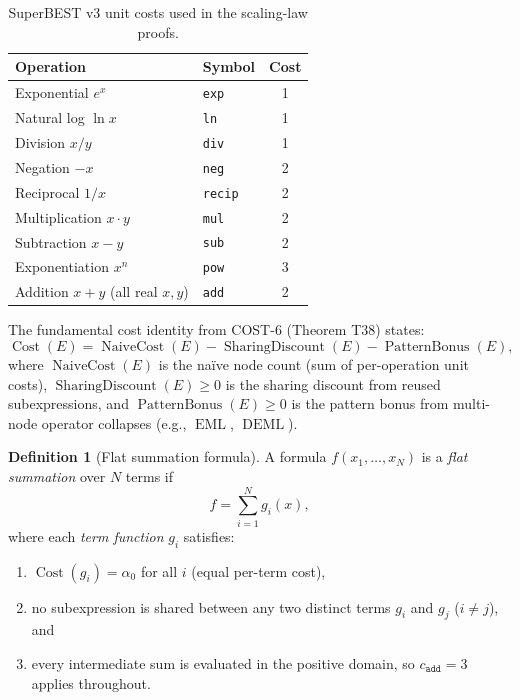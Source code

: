 \documentclass[12pt,a4paper]{article}
\theoremstyle{definition}
\newtheorem{definition}[theorem]{Definition}
\newcommand{\EML}{\operatorname{EML}}
\newcommand{\DEML}{\operatorname{DEML}}
\newcommand{\Cost}{\operatorname{Cost}}
\newcommand{\NC}{\operatorname{NaiveCost}}
\newcommand{\SD}{\operatorname{SharingDiscount}}
\newcommand{\PB}{\operatorname{PatternBonus}}
\begin{document}
\begin{table}[h]
\centering
\caption{SuperBEST v3 unit costs used in the scaling-law proofs.}
\label{tab:costs}
\smallskip
\begin{tabular}{@{}llc@{}}
\toprule
\textbf{Operation} & \textbf{Symbol} & \textbf{Cost} \\
\midrule
Exponential $e^x$                   & \texttt{exp}   & 1 \\
Natural log $\ln x$                 & \texttt{ln}    & 1 \\
Division $x/y$                      & \texttt{div}   & 1 \\
Negation $-x$                       & \texttt{neg}   & 2 \\
Reciprocal $1/x$                    & \texttt{recip} & 2 \\
Multiplication $x \cdot y$          & \texttt{mul}   & 2 \\
Subtraction $x - y$                 & \texttt{sub}   & 2 \\
Exponentiation $x^n$                & \texttt{pow}   & 3 \\
Addition $x + y$ (all real $x,y$)   & \texttt{add}   & 2 \\
\bottomrule
\end{tabular}
\end{table}

The fundamental cost identity from COST-6 (Theorem T38) states:
\begin{equation}
  \label{eq:T38}
  \Cost(E) = \NC(E) - \SD(E) - \PB(E),
\end{equation}
where $\NC(E)$ is the na\"{i}ve node count (sum of per-operation unit costs),
$\SD(E) \geq 0$ is the sharing discount from reused subexpressions, and
$\PB(E) \geq 0$ is the pattern bonus from multi-node operator collapses
(e.g., $\EML$, $\DEML$).

\begin{definition}[Flat summation formula]
\label{def:flat}
A formula $f(x_1, \ldots, x_N)$ is a \emph{flat summation} over $N$ terms if
\[
  f = \sum_{i=1}^{N} g_i(x),
\]
where each \emph{term function} $g_i$ satisfies:
\begin{enumerate}
  \item $\Cost(g_i) = \alpha_0$ for all $i$ (equal per-term cost),
  \item no subexpression is shared between any two distinct terms $g_i$ and
        $g_j$ ($i \neq j$), and
  \item every intermediate sum is evaluated in the positive domain, so
        $c_{\texttt{add}} = 3$ applies throughout.
\end{enumerate}
\end{definition}
\end{document}
